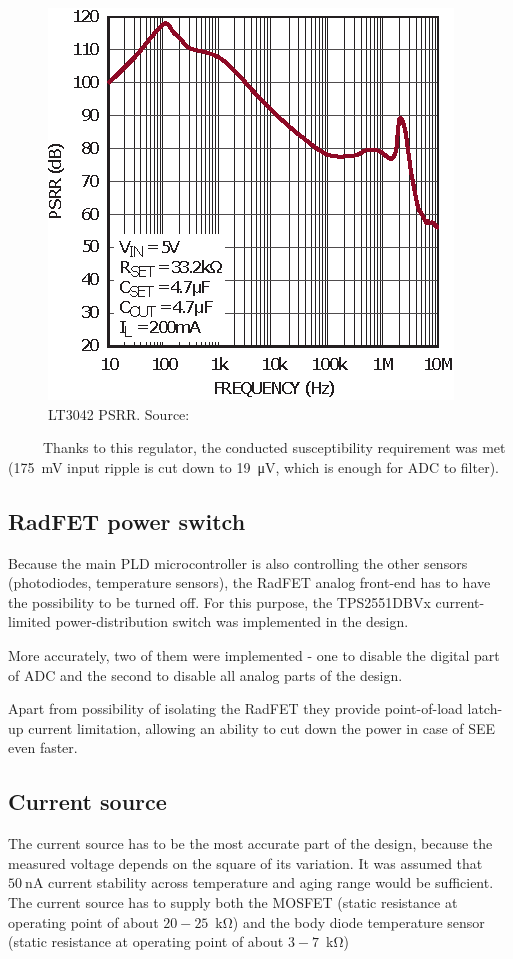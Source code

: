         \begin{figure}[H]
            \centering
            \includegraphics[width=0.4\paperwidth]{img/06/LT3042_PSRR.eps}
            \caption{LT3042 PSRR. Source: \cite{LT3042_datasheet}}
            \label{LT3042_PSRR}
        \end{figure}

        Thanks to this regulator, the conducted susceptibility requirement was met (\SI{175}{\mV} input ripple is cut down to \SI{19}{\uV}, which is enough for ADC to filter).

    \subsection{RadFET power switch}
        Because the main PLD microcontroller is also controlling the other sensors (photodiodes, temperature sensors), the RadFET analog front-end has to have the possibility to be turned off. For this purpose, the TPS2551DBVx current-limited power-distribution switch was implemented in the design.

        More accurately, two of them were implemented - one to disable the digital part of ADC and the second to disable all analog parts of the design.

        Apart from possibility of isolating the RadFET they provide point-of-load latch-up current limitation, allowing an ability to cut down the power in case of SEE even faster.

    \subsection{Current source}
        The current source has to be the most accurate part of the design, because the measured voltage depends on the square of its variation. It was assumed that $\SI{50}{\nano\ampere}$ current stability across temperature and aging range would be sufficient. The current source has to supply both the MOSFET (static resistance at operating point of about $20-25$~\si{\kilo\ohm}) and the body diode temperature sensor (static resistance at operating point of about     $3-7$~\si{\kilo\ohm})

